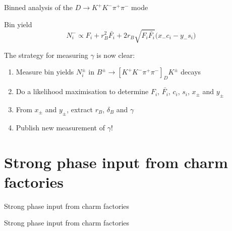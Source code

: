 \documentclass{beamer}
\begin{document}
\begin{frame}{Binned analysis of the $D\to K^+K^-\pi^+\pi^-$ mode}
  \begin{center}
    \begin{minipage}{8cm}
      \begin{block}{\centering Bin yield}
        \vspace{-0.5cm}
        \begin{equation*}
          N_i^-\propto F_i + r_B^2\bar{F_i} + 2r_B\sqrt{F_i\bar{F_i}}\big(x_-c_i - y_-s_i\big)
        \end{equation*}
      \end{block}
    \end{minipage}
  \end{center}
  \vspace{0.3cm}
  \begin{center}
    \Large The strategy for measuring $\gamma$ is now clear:
  \end{center}
  \begin{enumerate}
    \setlength\itemsep{1.0em}
    \item{Measure bin yields $N_i^\pm$ in $B^\pm\to[K^+K^-\pi^+\pi^-]_DK^\pm$ decays}
    \item{Do a likelihood maximisation to determine $F_i$, $\bar{F_i}$, $c_i$, $s_i$, $x_\pm$ and $y_\pm$}
    \item{From $x_\pm$ and $y_\pm$, extract $r_B$, $\delta_B$ and $\gamma$}
    \item{Publish new measurement of $\gamma$!}
  \end{enumerate}
\end{frame}

\section{Strong phase input from charm factories}
\begin{frame}{Strong phase input from charm factories}
  \begin{center}
    {\huge Strong phase input from charm factories}
  \end{center}
\end{frame}
\end{document}
